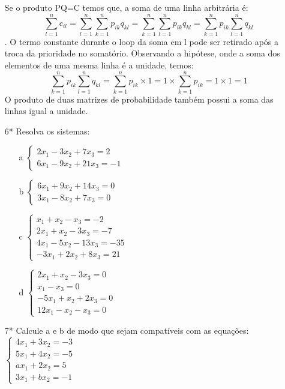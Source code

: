 \documentclass[a4paper]{article}
\begin{document}
\begin{itemize}
\textcolor[rgb]{0,0,1}{Se o produto PQ=C temos que, a soma de uma linha arbitrária é:
$$
\sum\limits_{l=1}^nc_{il}=\sum\limits_{l=1}^n\sum\limits_{k=1}^n p_{ik}q_{kl}=\sum\limits_{k=1}^n\sum\limits_{l=1}^n p_{ik}q_{kl}=\sum\limits_{k=1}^n p_{ik}\sum\limits_{l=1}^n q_{kl}
$$.
O termo constante durante o loop da soma em l pode ser retirado após a troca da prioridade no somatório. Observando a hipótese, onde a soma dos elementos de uma mesma linha é a unidade, temos:
$$
\sum\limits_{k=1}^n p_{ik}\sum\limits_{l=1}^n q_{kl}
=\sum\limits_{k=1}^n p_{ik}\times 1=1\times \sum\limits_{k=1}^n p_{ik} = 1 \times 1 = 1
$$
O produto de duas matrizes de probabilidade também possui a soma das linhas igual a unidade.
}
\item[6*] Resolva os sistemas:
\begin{itemize}
\item[a]
$ \left\{
\begin{array}{ll}
\displaystyle 2x_1 - 3x_2 + 7x_3 = 2 \\
\displaystyle 6x_1 - 9x_2 + 21x_3 = -1
\end{array}
\right.
$
\item[b]
$ \left\{
\begin{array}{ll}
\displaystyle 6x_1+9x_2+14x_3=0 \\
\displaystyle 3x_1-8x_2+7x_3=0
\end{array}
\right.
$
\item[c]
$ \left\{
\begin{array}{llll}
\displaystyle x_1+x_2-x_3=-2 \\
\displaystyle 2x_1+x_2-3x_3=-7 \\
\displaystyle 4x_1-5x_2-13x_3=-35 \\
\displaystyle -3x_1+2x_2+8x_3=21
\end{array}
\right.
$
\item[d]
$ \left\{
\begin{array}{llll}
\displaystyle 2x_1+x_2-3x_3=0 \\
\displaystyle x_1-x_3=0 \\
\displaystyle -5x_1+x_2+2x_3=0 \\
\displaystyle 12x_1-x_2-x_3=0
\end{array}
\right.
$
\end{itemize}

\item[7*] Calcule a e b de modo que sejam compatíveis com as equações:\\
$ \left\{
\begin{array}{llll}
\displaystyle 4x_1+3x_2=-3 \\
\displaystyle 5x_1+4x_2=-5 \\
\displaystyle ax_1+2x_2=5 \\
\displaystyle 3x_1+bx_2=-1
\end{array}
\right.
$


\end{itemize}
\end{document}
